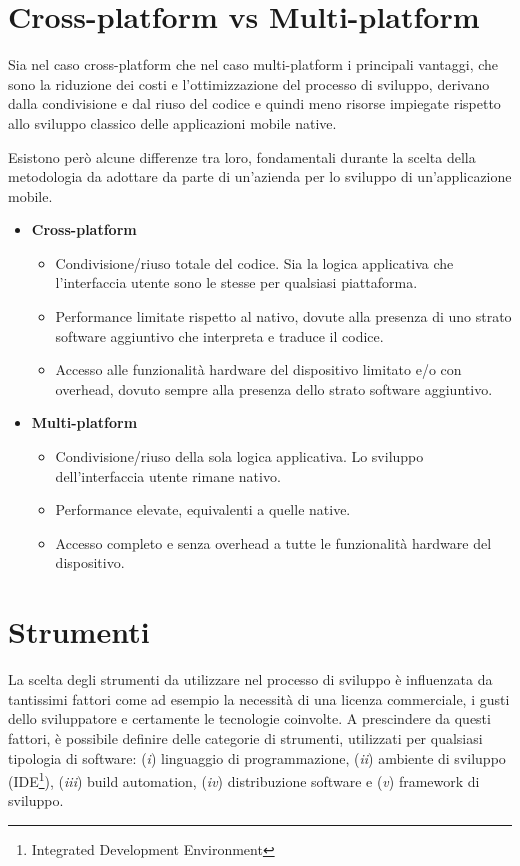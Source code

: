 \section{Cross-platform vs Multi-platform}
Sia nel caso cross-platform che nel caso multi-platform i principali vantaggi,
che sono la riduzione dei costi e l'ottimizzazione del processo di sviluppo, 
derivano dalla condivisione e dal riuso del codice e quindi meno risorse impiegate rispetto allo sviluppo classico delle applicazioni mobile native.

Esistono però alcune differenze tra loro,
fondamentali durante la scelta della metodologia da adottare da parte di un'azienda per lo sviluppo di un'applicazione mobile.

\begin{itemize}
    \item \textbf{Cross-platform}
    \begin{itemize}
        \item Condivisione/riuso totale del codice. Sia la logica applicativa che l'interfaccia utente sono le stesse per qualsiasi piattaforma.
        
        \item Performance limitate rispetto al nativo, dovute alla presenza di uno strato software aggiuntivo che interpreta e traduce il codice.
        
        \item Accesso alle funzionalità hardware del dispositivo limitato e/o con overhead, dovuto sempre alla presenza dello strato software aggiuntivo.
    \end{itemize}
    
    \item \textbf{Multi-platform}
    \begin{itemize}
        \item Condivisione/riuso della sola logica applicativa. Lo sviluppo dell'interfaccia utente rimane nativo.
        
        \item Performance elevate, equivalenti a quelle native.
        
        \item Accesso completo e senza overhead a tutte le funzionalità hardware del dispositivo.
    \end{itemize}
\end{itemize}

\section{Strumenti}
\label{app-multiplatform-tools}
La scelta degli strumenti da utilizzare nel processo di sviluppo è influenzata da tantissimi fattori come ad esempio la necessità di una licenza commerciale, 
i gusti dello sviluppatore e certamente le tecnologie coinvolte. 
A prescindere da questi fattori,
è possibile definire delle categorie di strumenti, 
utilizzati per qualsiasi tipologia di software: 
(\textit{i}) linguaggio di programmazione, 
(\textit{ii}) ambiente di sviluppo (IDE\footnote{Integrated Development Environment}), 
(\textit{iii}) build automation, 
(\textit{iv}) distribuzione software e (\textit{v}) framework di sviluppo.


